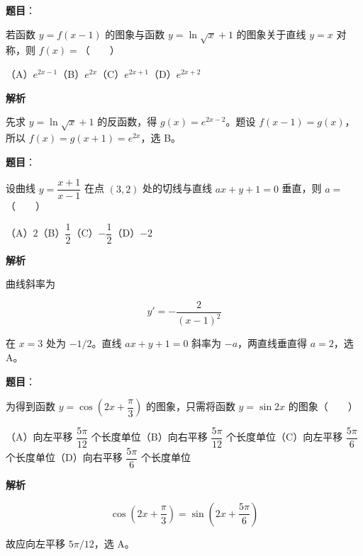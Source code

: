 \begin{answer}

\textbf{题目}：

若函数 $y=f(x-1)$ 的图象与函数 $y=\ln\sqrt{x}+1$ 的图象关于直线 $y=x$ 对称，则 $f(x)=$\mbox{（　　）}

（A）$e^{2x-1}$\quad（B）$e^{2x}$\quad（C）$e^{2x+1}$\quad（D）$e^{2x+2}$

\textbf{解析}

先求 $y=\ln\sqrt{x}+1$ 的反函数，得 $g(x)=e^{2x-2}$。题设 $f(x-1)=g(x)$，所以 $f(x)=g(x+1)=e^{2x}$，选 B。


\end{answer}
\begin{answer}

\textbf{题目}：

设曲线 $y=\dfrac{x+1}{x-1}$ 在点 $(3,2)$ 处的切线与直线 $ax+y+1=0$ 垂直，则 $a=$\mbox{（　　）}

（A）$2$\quad（B）$\dfrac12$\quad（C）$-\dfrac12$\quad（D）$-2$

\textbf{解析}

曲线斜率为

\nopagebreak[4]
\[
y'=-\frac2{(x-1)^2}
\]

在 $x=3$ 处为 $-1/2$。直线 $ax+y+1=0$ 斜率为 $-a$，两直线垂直得 $a=2$，选 A。


\end{answer}
\begin{answer}

\textbf{题目}：

为得到函数 $y=\cos\left(2x+\dfrac\pi3\right)$ 的图象，只需将函数 $y=\sin2x$ 的图象\mbox{（　　）}

（A）向左平移 $\dfrac{5\pi}{12}$ 个长度单位\quad（B）向右平移 $\dfrac{5\pi}{12}$ 个长度单位\quad（C）向左平移 $\dfrac{5\pi}{6}$ 个长度单位\quad（D）向右平移 $\dfrac{5\pi}{6}$ 个长度单位

\textbf{解析}

\nopagebreak[4]
\[
\cos\left(2x+\frac\pi3\right)=\sin\left(2x+\frac{5\pi}6\right)
\]

故应向左平移 $5\pi/12$，选 A。


\end{answer}
